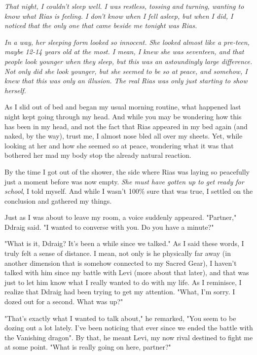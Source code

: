 \documentclass{article}
\begin{document}
\emph{That night, I couldn't sleep well. I was restless, tossing and turning, wanting to know what Rias is feeling. I don't know when I fell asleep, but when I did, I noticed that the only one that came beside me tonight was Rias.}

\emph{In a way, her sleeping form looked so innocent. She looked almost like a pre-teen, maybe 12-14 years old at the most. I mean, I knew she was seventeen, and that people look younger when they sleep, but this was an astoundingly large difference. Not only did she look younger, but she seemed to be so at peace, and somehow, I knew that this was only an illusion. The real Rias was only just starting to show herself.}

As I slid out of bed and began my usual morning routine, what happened last night kept going through my head. And while you may be wondering how this has been in my head, and not the fact that Rias appeared in my bed again (and naked, by the way), trust me, I almost nose bled all over my sheets. Yet, while looking at her and how she seemed so at peace, wondering what it was that bothered her mad my body stop the already natural reaction.

By the time I got out of the shower, the side where Rias was laying so peacefully just a moment before was now empty. \emph{She must have gotten up to get ready for school}, I told myself. And while I wasn't 100\% sure that was true, I settled on the conclusion and gathered my things.

Just as I was about to leave my room, a voice suddenly appeared. "Partner," Ddraig said. "I wanted to converse with you. Do you have a minute?"

"What is it, Ddraig? It's been a while since we talked." As I said these words, I truly felt a sense of distance. I mean, not only is he physically far away (in another dimension that is somehow connected to my Sacred Gear), I haven't talked with him since my battle with Levi (more about that later), and that was just to let him know what I really wanted to do with my life. As I reminisce, I realize that Ddraig had been trying to get my attention. "What, I'm sorry. I dozed out for a second. What was up?"

"That's exactly what I wanted to talk about," he remarked, "You seem to be dozing out a lot lately. I've been noticing that ever since we ended the battle with the Vanishing dragon". By that, he meant Levi, my now rival destined to fight me at some point. "What is really going on here, partner?"
\end{document}
